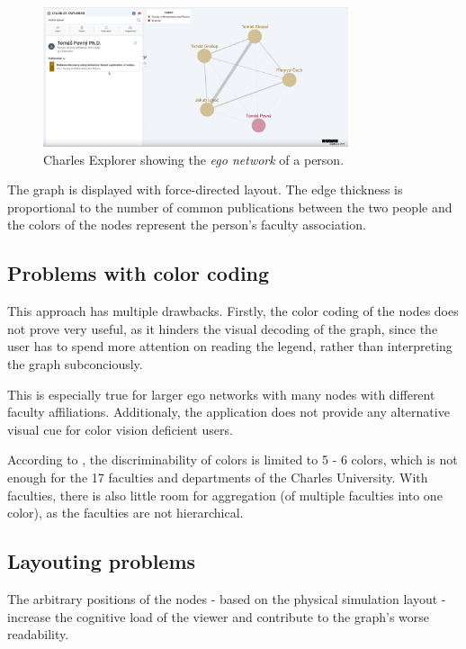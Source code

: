 \begin{figure}[ht!]
    \includegraphics[width=0.8\textwidth]{../img/charles-explorer-old-view.png}
    \centering
    \caption{Charles Explorer showing the \textit{ego network} of a person.}
\end{figure}

The graph is displayed with force-directed layout. The edge thickness is proportional to the number of common publications between 
the two people and the colors of the nodes represent the person's faculty association.

\subsection{Problems with color coding}

This approach has multiple drawbacks. 
Firstly, the color coding of the nodes does not prove very useful, as it hinders the visual decoding of the graph, 
since the user has to spend more attention on reading the legend, rather than interpreting the graph subconciously.

This is especially true for larger ego networks with many nodes with different faculty affiliations. 
Additionaly, the application does not provide any alternative visual cue for color vision deficient users.

According to \cite{Cleveland1985}, the discriminability of colors is limited to 5 - 6 colors, which is not enough for the 17 faculties and departments 
of the Charles University. With faculties, there is also little room for aggregation (of multiple faculties into one color), as the faculties are not 
hierarchical.

\subsection{Layouting problems}

The arbitrary positions of the nodes - based on the physical simulation layout - increase the cognitive load of the viewer and contribute to the graph's worse readability.

